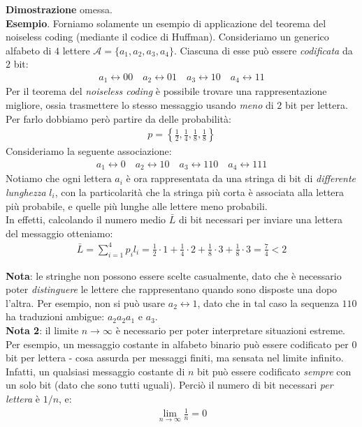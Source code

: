 \documentclass[../../InformazioneQuantistica.tex]{subfiles}
\begin{document}
\textbf{Dimostrazione} omessa.\\

\textbf{Esempio}. Forniamo solamente un esempio di applicazione del teorema del noiseless coding (mediante il codice di Huffman). Consideriamo un generico alfabeto di $4$ lettere $\mathcal{A}=\{a_1, a_2, a_3, a_4\}$. Ciascuna di esse può essere \textit{codificata} da $2$ bit:
\begin{align*}
a_1 \leftrightarrow 00 \quad a_2 \leftrightarrow 01 \quad a_3 \leftrightarrow 10 \quad a_4 \leftrightarrow 11
\end{align*} 
Per il teorema del \textit{noiseless coding} è possibile trovare una rappresentazione migliore, ossia trasmettere lo stesso messaggio usando \textit{meno} di $2$ bit per lettera. Per farlo dobbiamo però partire da delle probabilità:
\begin{align*}
p = \left \{\frac{1}{2}, \frac{1}{4}, \frac{1}{8}, \frac{1}{8}\right\}
\end{align*}
Consideriamo la seguente associazione:
\begin{align*}
a_1 \leftrightarrow 0  \quad a_2 \leftrightarrow 10 \quad a_3 \leftrightarrow 110 \quad a_4 \leftrightarrow 111
\end{align*}
Notiamo che ogni lettera $a_i$ è ora rappresentata da una stringa di bit di \textit{differente lunghezza} $l_i$, con la particolarità che la stringa più corta è associata alla lettera più probabile, e quelle più lunghe alle lettere meno probabili.\\
In effetti, calcolando il numero medio $\bar{L}$ di bit necessari per inviare una lettera del messaggio otteniamo:
\begin{align*}
\bar{L} = \sum_{i=1}^4 p_i l_i = \frac{1}{2}\cdot 1 + \frac{1}{4}\cdot 2 + \frac{1}{8}\cdot 3 + \frac{1}{8}\cdot 3 =\frac{7}{4} < 2
\end{align*}

\textbf{Nota}: le stringhe non possono essere scelte casualmente, dato che è necessario poter \textit{distinguere} le lettere che rappresentano quando sono disposte una dopo l'altra. Per esempio, non si può usare $a_2 \leftrightarrow 1$, dato che in tal caso la sequenza $110$ ha traduzioni ambigue: $a_2 a_2 a_1$ e $a_3$.\\

\textbf{Nota 2}: il limite $n\to \infty$ è necessario per poter interpretare situazioni estreme. Per esempio, un messaggio costante in alfabeto binario può essere codificato per $0$ bit per lettera - cosa assurda per messaggi finiti, ma sensata nel limite infinito. Infatti, un qualsiasi messaggio costante di $n$ bit può essere codificato \textit{sempre} con un solo bit (dato che sono tutti uguali). Perciò il numero di bit necessari \textit{per lettera} è $1/n$, e:
\begin{align*}
    \lim_{n\to \infty} \frac{1}{n} = 0
\end{align*}
\end{document}

